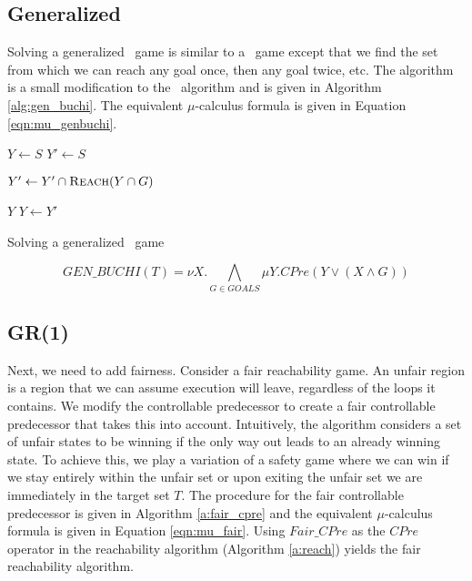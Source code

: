 \subsection{Generalized \buchi}

Solving a generalized \buchi\ game is similar to a \buchi\ game except that we find the set from which we can reach any goal once, then any goal twice, etc. The algorithm is a small modification to the \buchi\ algorithm and is given in Algorithm \ref{alg:gen_buchi}. The equivalent $\mu$-calculus formula is given in Equation \ref{eqn:mu_genbuchi}.

\begin{algorithm}[t]
\begin{algorithmic}
\State $Y \gets S$
\Loop
\State $Y' \gets S$

\State $Y' \gets Y' \cap \Call{Reach}{Y \cap G}$
\EndFor

\State\Return $Y$\EndIf
\State $Y \gets Y'$

\EndLoop
\EndFunction
\end{algorithmic}
\caption{Solving a generalized \buchi\ game}
\label{alg:gen_buchi}
\end{algorithm}

\begin{equation}
    \mathit{GEN\_BUCHI}(T) = \nu X. \bigwedge_{G \in GOALS} \mu Y. CPre(Y \vee (X \wedge G))
\label{eqn:mu_genbuchi}
\end{equation}

\subsection{GR(1)}

Next, we need to add fairness. Consider a fair reachability game. An unfair region is a region that we can assume execution will leave, regardless of the loops it contains. We modify the controllable predecessor to create a fair controllable predecessor that takes this into account. Intuitively, the algorithm considers a set of unfair states to be winning if the only way out leads to an already winning state. To achieve this, we play a variation of a safety game where we can win if we stay entirely within the unfair set or upon exiting the unfair set we are immediately in the target set $T$. The procedure for the fair controllable predecessor is given in Algorithm \ref{a:fair_cpre} and the equivalent $\mu$-calculus formula is given in Equation \ref{eqn:mu_fair}. Using $Fair\_CPre$ as the $CPre$ operator in the reachability algorithm (Algorithm \ref{a:reach}) yields the fair reachability algorithm. 

